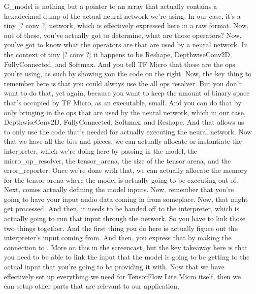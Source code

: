       G\_model is nothing but a pointer to an array that
      actually contains a hexadecimal dump of the actual neural network we're using.
      In our case, it's a tiny [? conv ?] network, which is effectively
      expressed here in a raw format.
      Now, out of these, you've actually got to determine, what are those operators?
      Now, you've got to know what the operators are
      that are used by a neural network.
      In the context of tiny [? conv ?] it happens
      to be Reshape, DepthwiseConv2D, FullyConnected, and Softmax.
      And you tell TF Micro that these are the ops you're using,
      as such by showing you the code on the right.
      Now, the key thing to remember here is that you could always
      use the all ops resolver.
      But you don't want to do that, yet again,
      because you want to keep the amount of binary space
      that's occupied by TF Micro, as an executable, small.
      And you can do that by only bringing in the ops that
      are used by the neural network, which in our case, DepthwiseConv2D,
      FullyConnected, Softmax, and Reshape.
      And that allows us to only use the code that's
      needed for actually executing the neural network.
      Now that we have all the bits and pieces,
      we can actually allocate or instantiate the interpreter,
      which we're doing here by passing in the model, the micro\_op\_resolver,
      the tensor\_arena, the size of the tensor arena, and the error\_reporter.
      Once we're done with that, we can actually allocate the memory
      for the tensor arena where the model is actually going to be executing out of.
      Next, comes actually defining the model inputs.
      Now, remember that you're going to have your input audio
      data coming in from someplace.
      Now, that might get processed.
      And then, it needs to be handed off to the interpreter, which
      is actually going to run that input through the network.
      So you have to link those two things together.
      And the first thing you do here is actually figure out
      the interpreter's input coming from.
      And then, you express that by making the connection to .
      More on this in the screencast, but the key takeaway
      here is that you need to be able to link the input that the model is
      going to be getting to the actual input that you're
      going to be providing it with.
      Now that we have effectively set up everything
      we need for TensorFlow Lite Micro itself,
      then we can setup other parts that are relevant to our application,
